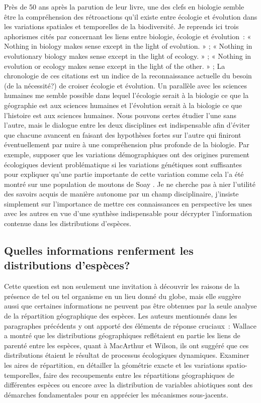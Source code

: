 Près de 50 ans après la parution de leur livre, une des clefs en
biologie semble être la compréhension des rétroactions qu'il existe
entre écologie et évolution dans les variations spatiales et temporelles
de la biodiversité. Je reprends ici trois aphorismes cités par
\citet{Schoener2011a} concernant les liens entre biologie, écologie et
évolution~: « Nothing in biology makes sense except in the light of
evolution. » \citep{Dobzhansky1973}; « Nothing in evolutionary biology
makes sense except in the light of ecology. » \citep{grant2008}; «
Nothing in evolution or ecology makes sense except in the light of the
other. » \citep{Pelletier2009a}; La chronologie de ces citations est un
indice de la reconnaissance actuelle du besoin (de la nécessité?) de
croiser écologie et évolution. Un parallèle avec les sciences humaines
me semble possible dans lequel l'écologie serait à la biologie ce que la
géographie est aux sciences humaines et l'évolution serait à la biologie
ce que l'histoire est aux sciences humaines. Nous pouvons certes étudier
l'une sans l'autre, mais le dialogue entre les deux disciplines est
indispensable afin d'éviter que chacune avancent en faisant des
hypothèses fortes sur l'autre qui finiront éventuellement par nuire à
une compréhension plus profonde de la biologie. Par exemple, supposer
que les variations démographiques ont des origines purement écologiques
devient problématique si les variations génétiques sont suffisantes pour
expliquer qu'une partie importante de cette variation comme cela l'a été
montré sur une population de moutons de Soay \citep{Pelletier2007}. Je
ne cherche pas à nier l'utilité des savoirs acquis de manière autonome
par un champ disciplinaire, j'insiste simplement sur l'importance de
mettre ces connaissances en perspective les unes avec les autres en vue
d'une synthèse indispensable pour décrypter l'information contenue dans
les distributions d'espèces.

\subsection*{Quelles informations renferment les distributions
d'espèces?}\label{quelles-informations-renferment-les-distributions-despuxe8ces}

Cette question est non seulement une invitation à découvrir les raisons
de la présence de tel ou tel organisme en un lieu donné du globe, mais
elle suggère aussi que certaines informations ne peuvent pas être
obtenues par la seule analyse de la répartition géographique des
espèces. Les auteurs mentionnés dans les paragraphes précédents y ont
apporté des éléments de réponse cruciaux~: Wallace a montré que les
distributions géographiques reflétaient en partie les liens de parenté
entre les espèces, quant à MacArthur et Wilson, ils ont suggéré que ces
distributions étaient le résultat de processus écologiques dynamiques.
Examiner les aires de répartition, en détailler la géométrie exacte et
les variations spatio-temporelles, faire des recoupements entre les
répartitions géographiques de différentes espèces ou encore avec la
distribution de variables abiotiques sont des démarches fondamentales
pour en apprécier les mécanismes sous-jacents.

